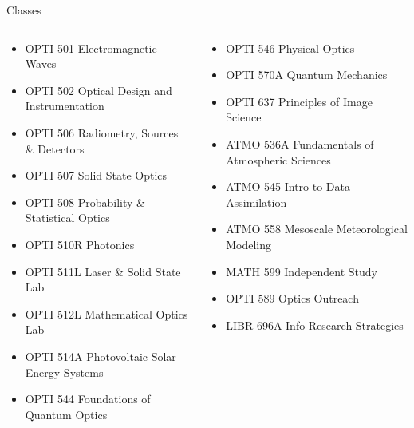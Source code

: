 \documentclass[aspectratio=169]{beamer}
\begin{document}
\begin{frame}{Classes}
\fontsize{8}{12}
\begin{columns}
\begin{column}{0.5 \textwidth}
\begin{itemize}
\item OPTI 501 Electromagnetic Waves
\item OPTI 502 Optical Design and Instrumentation
\item OPTI 506 Radiometry, Sources \& Detectors
\item OPTI 507 Solid State Optics
\item OPTI 508 Probability \& Statistical Optics
\item OPTI 510R Photonics
\item OPTI 511L Laser \& Solid State Lab
\item OPTI 512L Mathematical Optics Lab
\item OPTI 514A Photovoltaic Solar Energy Systems
\item OPTI 544 Foundations of Quantum Optics
\end{itemize}
\end{column}
\begin{column}{0.5 \textwidth}
\begin{itemize}
\item OPTI 546 Physical Optics
\item OPTI 570A Quantum Mechanics
\item OPTI 637 Principles of Image Science
\item ATMO 536A Fundamentals of Atmospheric Sciences
\item ATMO 545 Intro to Data Assimilation
\item ATMO 558 Mesoscale Meteorological Modeling
\item MATH 599 Independent Study
\item OPTI 589 Optics Outreach
\item LIBR 696A Info Research Strategies
\end{itemize}
\end{column}
\end{columns}
\end{frame}
\end{document}
